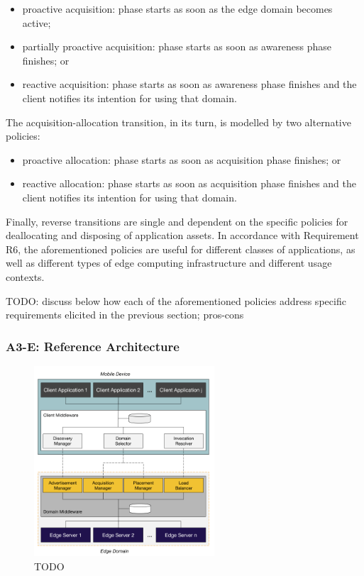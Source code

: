 \begin{itemize}

\item proactive acquisition: phase starts as soon as the edge domain becomes active; 

\item partially proactive acquisition: phase starts as soon as awareness phase finishes; or

\item reactive acquisition: phase starts as soon as awareness phase finishes and the client notifies its intention for using that domain.

\end{itemize}

The acquisition-allocation transition, in its turn, is modelled by two alternative policies: 

\begin{itemize}

\item proactive allocation: phase starts as soon as acquisition phase finishes; or

\item reactive allocation: phase starts as soon as acquisition phase finishes and the client notifies its intention for using that domain.

\end{itemize}

Finally, reverse transitions are single and dependent on the specific policies for deallocating and disposing of application assets. 
In accordance with Requirement R6, the aforementioned policies are useful for different classes of applications, as well as different types of edge computing infrastructure and different usage contexts.


TODO: discuss below how each of the aforementioned policies address specific requirements elicited in the previous section; pros-cons

\subsubsection{A3-E: Reference Architecture}\label{sec:a3-e-reference-architecture}

\begin{figure}
  \includegraphics[width=0.6\textwidth]{figs/reference-architecture.png}
  \caption{TODO}
  \label{fig:reference-architecture}
\end{figure}

